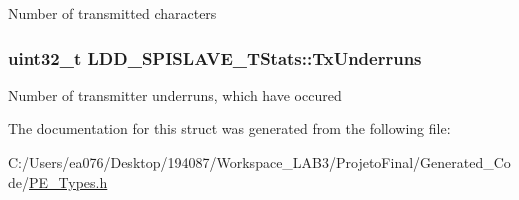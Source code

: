 Number of transmitted characters \hypertarget{struct_l_d_d___s_p_i_s_l_a_v_e___t_stats_ab2e5342f4a486b20ae9306f451451a77}{
\subsubsection[{Tx\-Underruns}]{\setlength{\rightskip}{0pt plus 5cm}uint32\-\_\-t L\-D\-D\-\_\-\-S\-P\-I\-S\-L\-A\-V\-E\-\_\-\-T\-Stats\-::\-Tx\-Underruns}}\label{struct_l_d_d___s_p_i_s_l_a_v_e___t_stats_ab2e5342f4a486b20ae9306f451451a77}
Number of transmitter underruns, which have occured 

The documentation for this struct was generated from the following file\-:\begin{DoxyCompactItemize}
\item 
C\-:/\-Users/ea076/\-Desktop/194087/\-Workspace\-\_\-\-L\-A\-B3/\-Projeto\-Final/\-Generated\-\_\-\-Code/\hyperlink{_p_e___types_8h}{P\-E\-\_\-\-Types.\-h}\end{DoxyCompactItemize}
